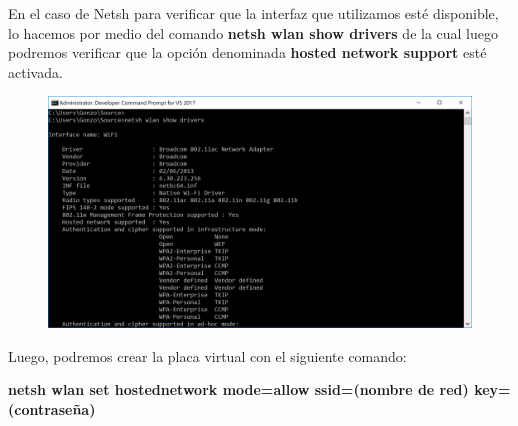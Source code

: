 \documentclass[10pt,a4paper]{article}
\begin{document}



En el caso de Netsh para verificar que la interfaz que utilizamos esté disponible, lo hacemos por medio del comando \textbf{netsh wlan show drivers} de la cual luego podremos verificar que la opción denominada \textbf{hosted network support} esté activada.

\begin{figure}[H]
\centerline{\includegraphics[scale=0.2]{images/hosted_network.jpg}}
\caption{}
\end{figure}

Luego, podremos crear la placa virtual con el siguiente comando:

\textbf{netsh wlan set hostednetwork mode=allow ssid=(nombre de red) key=(contraseña)}
\end{document}
